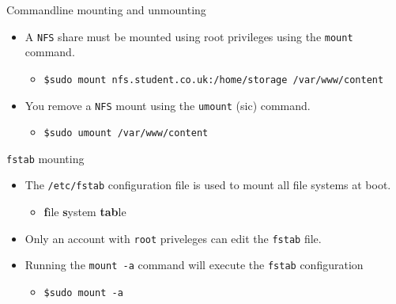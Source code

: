 \documentclass[xcolor=table]{beamer}
\begin{document}
\begin{frame}{Commandline mounting and unmounting}
  \begin{itemize}
    \item A \texttt{NFS} share must be mounted using root privileges using the \texttt{mount} command.
      \begin{itemize}
        \item \scriptsize \texttt{\$sudo mount nfs.student.co.uk:/home/storage /var/www/content}
      \end{itemize}
    \item You remove a \texttt{NFS} mount using the \texttt{umount} (sic) command.
      \begin{itemize}
        \item \texttt{\$sudo umount /var/www/content} 
      \end{itemize}
  \end{itemize}
\end{frame}

\begin{frame}{\texttt{fstab} mounting}
  \begin{itemize}
    \item The \texttt{/etc/fstab} configuration file is used to mount all file systems at boot.
      \begin{itemize}
        \item \textbf{f}ile \textbf{s}ystem \textbf{tab}le
      \end{itemize}
    \item Only an account with \texttt{root} priveleges can edit the \texttt{fstab} file.
    \item Running the \texttt{mount -a} command will execute the \texttt{fstab} configuration
      \begin{itemize}
        \item \texttt{\$sudo mount -a} 
      \end{itemize}
  \end{itemize}
\end{frame}
\end{document}

